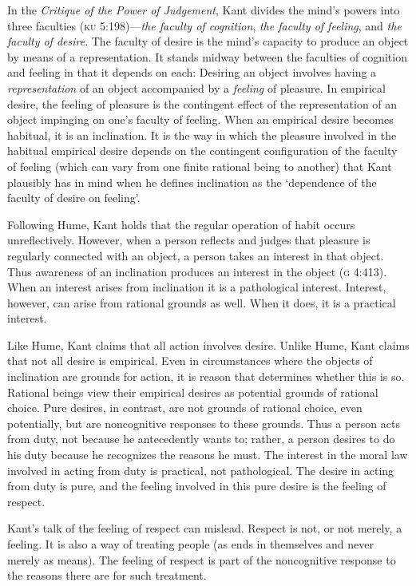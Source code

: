 \documentclass[12pt]{article}
\begin{document}
In the \emph{Critique of the Power of Judgement}, Kant divides the mind's powers into three faculties (\textsc{ku} 5:198)---\emph{the faculty of cognition}, \emph{the faculty of feeling}, and \emph{the faculty of desire}. The faculty of desire is the mind's capacity to produce an object by means of a representation. It stands midway between the faculties of cognition and feeling in that it depends on each: Desiring an object involves having a \emph{representation} of an object accompanied by a \emph{feeling} of pleasure. In empirical desire, the feeling of pleasure is the contingent effect of the representation of an object impinging on one's faculty of feeling. When an empirical desire becomes habitual, it is an inclination. It is the way in which the pleasure involved in the habitual empirical desire depends on the contingent configuration of the faculty of feeling (which can vary from one finite rational being to another) that Kant plausibly has in mind when he defines inclination as the `dependence of the faculty of desire on feeling'.

Following Hume, Kant holds that the regular operation of habit occurs unreflectively. However, when a person reflects and judges that pleasure is regularly connected with an object, a person takes an interest in that object. Thus awareness of an inclination produces an interest in the object (\textsc{g} 4:413). When an interest arises from inclination it is a pathological interest. Interest, however, can arise from rational grounds as well. When it does, it is a practical interest.

Like Hume, Kant claims that all action involves desire. Unlike Hume, Kant claims that not all desire is empirical. Even in circumstances where the objects of inclination are grounds for action, it is reason that determines whether this is so. Rational beings view their empirical desires as potential grounds of rational choice. Pure desires, in contrast, are not grounds of rational choice, even potentially, but are noncognitive responses to these grounds. Thus a person acts from duty, not because he antecedently wants to; rather, a person desires to do his duty because he recognizes the reasons he must. The interest in the moral law involved in acting from duty is practical, not pathological. The desire in acting from duty is pure, and the feeling involved in this pure desire is the feeling of respect.

Kant's talk of the feeling of respect can mislead. Respect is not, or not merely, a feeling. It is also a way of treating people (as ends in themselves and never merely as means). The feeling of respect is part of the noncognitive response to the reasons there are for such treatment.
\end{document}
